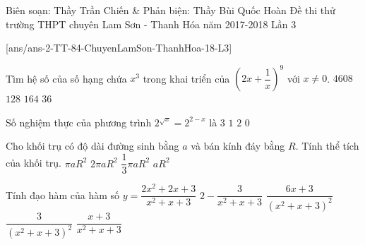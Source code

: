 \begin{name}
{Biên soạn: Thầy Trần Chiến \& Phản biện: Thầy Bùi Quốc Hoàn}
{Đề thi thử trường THPT chuyên Lam Sơn - Thanh Hóa năm 2017-2018 Lần 3}
\end{name}
\setcounter{ex}{0}\setcounter{bt}{0}
[ans/ans-2-TT-84-ChuyenLamSon-ThanhHoa-18-L3]

\begin{ex}%
	Tìm hệ số của số hạng chứa $x^3$ trong khai triển của $\left(2x+\dfrac{1}{x}\right)^9$ với $x\ne 0$.
	\choice
	{\True $4608$}
	{$128$}
	{$164$}
	{$36$}
\end{ex}

\begin{ex}%
	Số nghiệm thực  của phương trình $2^{\sqrt{x}} =2^{2-x}$ là
	\choice
	{$3$}
	{\True $1$}
	{$2$}
	{$0$}
\end{ex}

\begin{ex}%
	Cho khối trụ có độ dài đường sinh bằng $a$ và bán kính đáy bằng $R$. Tính thể tích của khối trụ.
	\choice
	{\True $\pi aR^2$}
	{$2\pi aR^2$}
	{$\dfrac{1}{3}\pi aR^2$}
	{$aR^2$}
\end{ex}

\begin{ex}%
	Tính đạo hàm của hàm số $y=\dfrac{2x^2+2x+3}{x^2+x+3}$
	\choice
	{$2-\dfrac{3}{x^2+x+3}$}
	{\True $\dfrac{6x+3}{(x^2+x+3)^2}$}
	{$\dfrac{3}{(x^2+x+3)^2}$}
	{$\dfrac{x+3}{x^2+x+3}$}
\end{ex}

